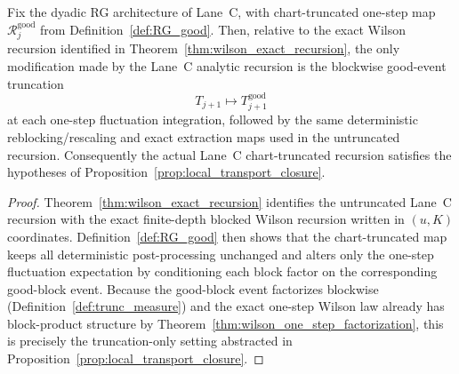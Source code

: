 \begin{proposition}\label{prop:laneC_transport_identification}
Fix the dyadic RG architecture of Lane~C, with chart-truncated one-step map $\mathcal R_j^{\mathrm{good}}$ from Definition~\ref{def:RG_good}.
Then, relative to the exact Wilson recursion identified in Theorem~\ref{thm:wilson_exact_recursion}, the only modification made by the Lane~C analytic recursion is the blockwise good-event truncation
\[
T_{j+1}\mapsto T_{j+1}^{\mathrm{good}}
\]
at each one-step fluctuation integration, followed by the same deterministic reblocking/rescaling and exact extraction maps used in the untruncated recursion.
Consequently the actual Lane~C chart-truncated recursion satisfies the hypotheses of Proposition~\ref{prop:local_transport_closure}.
\end{proposition}

\begin{proof}
Theorem~\ref{thm:wilson_exact_recursion} identifies the untruncated Lane~C recursion with the exact finite-depth blocked Wilson recursion written in $(u,K)$ coordinates.
Definition~\ref{def:RG_good} then shows that the chart-truncated map keeps all deterministic post-processing unchanged and alters only the one-step fluctuation expectation by conditioning each block factor on the corresponding good-block event.
Because the good-block event factorizes blockwise (Definition~\ref{def:trunc_measure}) and the exact one-step Wilson law already has block-product structure by Theorem~\ref{thm:wilson_one_step_factorization}, this is precisely the truncation-only setting abstracted in Proposition~\ref{prop:local_transport_closure}.
\end{proof}

